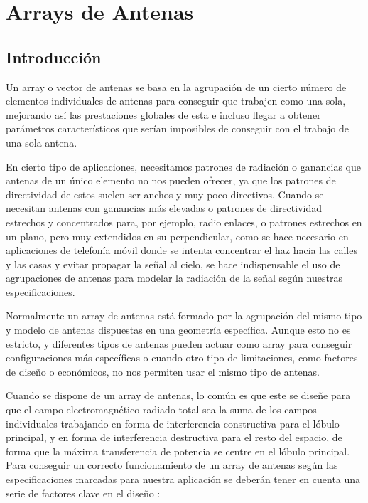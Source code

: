 
\chapter{Arrays de Antenas}
\label{arraysdeantenas}

\section{Introducción}

\par Un array o vector de antenas se basa en la agrupación de un cierto número de elementos individuales de antenas para conseguir que trabajen como una sola, mejorando así las prestaciones globales de esta e incluso llegar a obtener parámetros característicos que serían imposibles de conseguir con el trabajo de una sola antena.
\\
\par En cierto tipo de aplicaciones, necesitamos patrones de radiación o ganancias que antenas de un único elemento no nos pueden ofrecer, ya que los patrones de directividad de estos suelen ser anchos y muy poco directivos. Cuando se necesitan antenas con ganancias más elevadas o patrones de directividad estrechos y concentrados para, por ejemplo, radio enlaces, o patrones estrechos en un plano, pero muy extendidos en su perpendicular, como se hace necesario en aplicaciones de telefonía móvil donde se intenta concentrar el haz hacia las calles y las casas y evitar propagar la señal al cielo, se hace indispensable el uso de agrupaciones de antenas para modelar la radiación de la señal según nuestras especificaciones.
\\
\par Normalmente un array de antenas está formado por la agrupación del mismo tipo y modelo de antenas dispuestas en una geometría específica. Aunque esto no es estricto, y diferentes tipos de antenas pueden actuar como array para conseguir configuraciones más específicas o cuando otro tipo de limitaciones, como factores de diseño o económicos, no nos permiten usar el mismo tipo de antenas.
\\
\par Cuando se dispone de un array de antenas, lo común es que este se diseñe para que el campo electromagnético radiado total sea la suma de los campos individuales trabajando en forma de interferencia constructiva para el lóbulo principal, y en forma de interferencia destructiva para el resto del espacio, de forma que la máxima transferencia de potencia se centre en el lóbulo principal. Para conseguir un correcto funcionamiento de un array de antenas según las especificaciones marcadas para nuestra aplicación se deberán tener en cuenta una serie de factores clave en el diseño \cite{Valero2008}:

